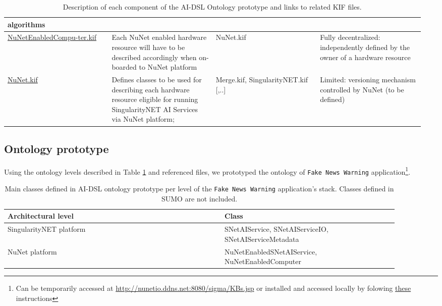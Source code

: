 \documentclass[]{report}
\begin{document}
\begin{table}[H]
\begin{tabular}{p{0.24\linewidth}|p{0.24\linewidth}|p{0.24\linewidth}|p{0.24\linewidth}|}
    algorithms \\
    \hline
    \href{https://github.com/singnet/ai-dsl/blob/master/ontology/
    NuNetEnabledComputer.kif}{NuNetEnabledCompu-ter.kif} &
    Each NuNet enabled hardware resource will have to be described accordingly
    when on-boarded to NuNet platform &
    NuNet.kif &
    Fully decentralized: independently defined by the owner of a hardware
    resource \\
    \hline
    \href{https://github.com/singnet/ai-dsl/blob/master/ontology/NuNet.kif}{NuNet.kif} &
    Defines classes to be used for describing each hardware resource eligible
    for running SingularityNET AI Services via NuNet platform;  &
    Merge.kif, SingularityNET.kif [,..]&
    Limited: versioning mechanism controlled by NuNet (to be defined) \\
    \end{tabular}
  \captionsetup{width=0.7\linewidth}
  \caption{\label{tbl:all_kif_files}Description of each component of the AI-DSL Ontology prototype and links to related KIF files.}
\end{table}

\subsection{Ontology prototype}
\label{sec:ontology_prototype}
Using the ontology levels described in Table \ref{tbl:all_kif_files} and
referenced files, we prototyped the ontology of \texttt{Fake News Warning}
application\footnote{Can be temporarily
accessed at \href{http://nunetio.ddns.net:8080/sigma/KBs.jsp}
{http://nunetio.ddns.net:8080/sigma/KBs.jsp} or installed and accessed locally
by folowing \href{https://github.com/nunet-io/ai-dsl/blob/master/ontology/tools/README.md}{these} instructions}.

\begin{table}[H]
  \scriptsize
  \centering
  \begin{tabular}{p{0.5\linewidth}|p{0.4\linewidth}|}
    \textbf{Architectural level} & \textbf{Class} \\
    \hline
    SingularityNET platform & SNetAIService, SNetAIServiceIO,
    SNetAIServiceMetadata\\
    \hline
    NuNet platform & NuNetEnabledSNetAIService, NuNetEnabledComputer\\
  \end{tabular}
  \captionsetup{width=0.9\linewidth}
  \caption{\label{tbl:custom_classes_prototype}Main classes defined in AI-DSL
  ontology prototype per level of the \texttt{Fake News Warning} application's
  stack. Classes defined in SUMO are not included.}
\end{table}
\end{document}
